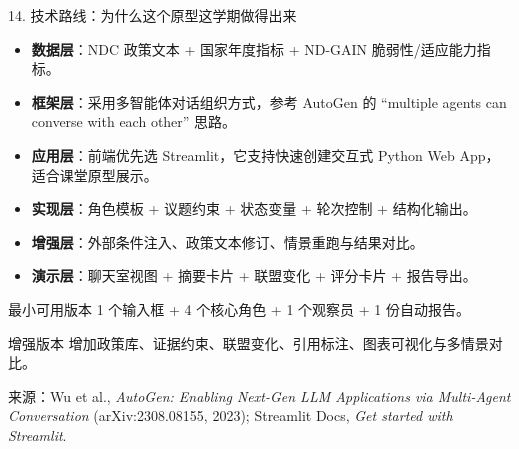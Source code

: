 \documentclass[aspectratio=169,10.5pt]{ctexbeamer}
\newcommand{\source}[1]{\vfill{\tiny\color{textgray}来源：#1}}
\begin{document}
\begin{frame}{14. 技术路线：为什么这个原型这学期做得出来}
  \begin{itemize}
    \item \textbf{数据层}：NDC 政策文本 + 国家年度指标 + ND-GAIN 脆弱性/适应能力指标。
    \item \textbf{框架层}：采用多智能体对话组织方式，参考 AutoGen 的 ``multiple agents can converse with each other'' 思路。
    \item \textbf{应用层}：前端优先选 Streamlit，它支持快速创建交互式 Python Web App，适合课堂原型展示。
    \item \textbf{实现层}：角色模板 + 议题约束 + 状态变量 + 轮次控制 + 结构化输出。
    \item \textbf{增强层}：外部条件注入、政策文本修订、情景重跑与结果对比。
    \item \textbf{演示层}：聊天室视图 + 摘要卡片 + 联盟变化 + 评分卡片 + 报告导出。
  \end{itemize}
  \begin{block}{最小可用版本}
    1 个输入框 + 4 个核心角色 + 1 个观察员 + 1 份自动报告。
  \end{block}
  \begin{block}{增强版本}
    增加政策库、证据约束、联盟变化、引用标注、图表可视化与多情景对比。
  \end{block}
  \source{Wu et al., \emph{AutoGen: Enabling Next-Gen LLM Applications via Multi-Agent Conversation} (arXiv:2308.08155, 2023); Streamlit Docs, \emph{Get started with Streamlit}.}
\end{frame}
\end{document}
